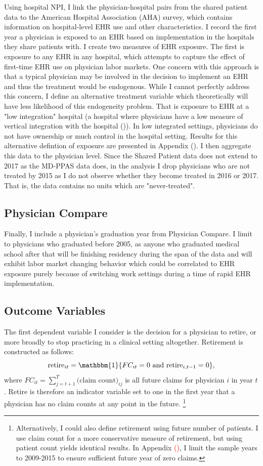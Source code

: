 \documentclass[11pt]{article}
\begin{document}
Using hospital NPI, I link the physician-hospital pairs from the shared patient data to the American Hospital Association (AHA) survey, which contains information on hospital-level EHR use and other characteristics. I record the first year a physician is exposed to an EHR based on implementation in the hospitals they share patients with. I create two measures of EHR exposure. The first is exposure to any EHR in any hospital, which attempts to capture the effect of first-time EHR use on physician labor markets. One concern with this approach is that a typical physician may be involved in the decision to implement an EHR and thus the treatment would be endogenous. While I cannot perfectly address this concern, I define an alternative treatment variable which theoretically will have less likelihood of this endogeneity problem. That is exposure to EHR at a "low integration" hospital (a hospital where physicians have a low measure of vertical integration with the hospital (\cite{madison2004hospital})). In low integrated settings, physicians do not have ownership or much control in the hospital setting. Results for this alternative defintion of exposure are presented in Appendix (). I then aggregate this data to the physician level. Since the Shared Patient data does not extend to 2017 as the MD-PPAS data does, in the analysis I drop physicians who are not treated by 2015 as I do not observe whether they become treated in 2016 or 2017. That is, the data contains no units which are "never-treated".

\subsection{Physician Compare}

Finally, I include a physician's graduation year from Physician Compare. I limit to physicians who graduated before 2005, as anyone who graduated medical school after that will be finishing residency during the span of the data and will exhibit labor market changing behavior which could be correlated to EHR exposure purely because of switching work settings during a time of rapid EHR implementation.

\subsection{Outcome Variables}\label{sec:outcome}

The first dependent variable I consider is the decision for a physician to retire, or more broadly to stop practicing in a clinical setting altogether. Retirement is constructed as follows: 
$$\text{retire}_{it}=\mathbbm{1}\{FC_{it}=0 \text{ and retire}_{i,t-1}=0\}, $$
where $FC_{it}=\sum\limits_{j=t+1}^T\text{(claim count)}_{ij}$ is all future claims for physician $i$ in year $t$. Retire is therefore an indicator variable set to one in the first year that a physician has no claim counts at any point in the future. \footnote{Alternatively, I could also define retirement using future number of patients. I use claim count for a more conservative measure of retirement, but using patient count yields identical results. In Appendix \textcolor{red}{()}, I limit the sample years to 2009-2015 to ensure sufficient future year of zero claims.}
\end{document}
